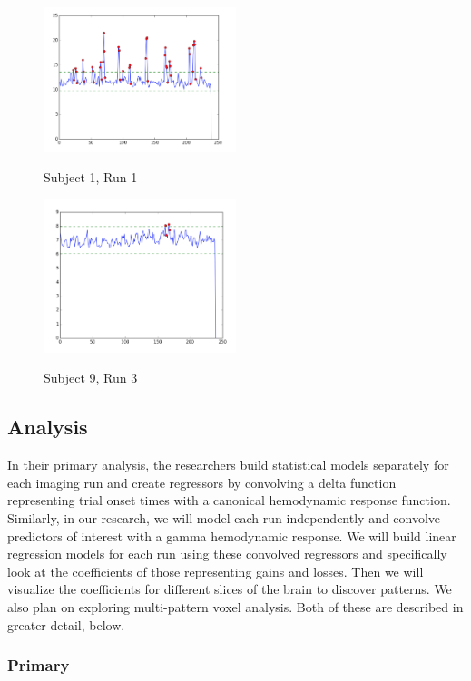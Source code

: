 \documentclass[11pt]{article}
\begin{document}
\begin{figure}[h]
\caption{Subject 1, Run 1}
\centering
\includegraphics[width=0.5\textwidth]{outliers-1-1.png}
\label{fig:outliers-1-1}
\end{figure}

\begin{figure}[h]
\caption{Subject 9, Run 3}
\centering
\includegraphics[width=0.5\textwidth]{outliers-9-3.png}
\label{fig:outliers-9-3}
\end{figure}

\subsection{Analysis}

In their primary analysis, the researchers build statistical models separately
for each imaging run and create regressors by convolving a delta function
representing trial onset times with a canonical hemodynamic response function.
Similarly, in our research, we will model each run independently and convolve
predictors of interest with a gamma hemodynamic response. We will build linear
regression models for each run using these convolved regressors and
specifically look at the coefficients of those representing gains and losses.
Then we will visualize the coefficients for different slices of the brain to
discover patterns. We also plan on exploring multi-pattern voxel analysis. Both
of these are described in greater detail, below.

\subsubsection{Primary}
\end{document}
